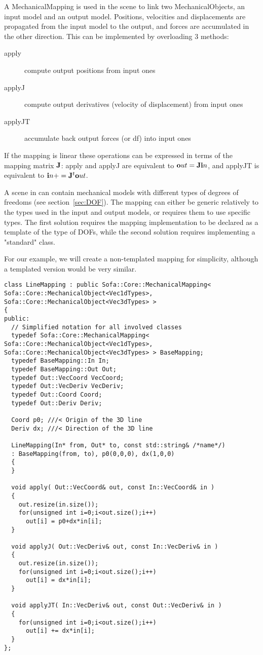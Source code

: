 A MechanicalMapping is used in the scene to link two MechanicalObjects, an input model and an output model. Positions, velocities and displacements are propagated from the input model to the output, and forces are accumulated in the other direction. This can be implemented by overloading 3 methods:

\begin{description}
\item[apply] compute output positions from input ones
\item[applyJ] compute output derivatives (velocity of displacement) from input ones
\item[applyJT] accumulate back output forces (or df) into input ones
\end{description}

If the mapping is linear these operations can be expressed in terms of the mapping matrix $\mathbf J$: apply and applyJ are equivalent to $\mathbf out = \mathbf J \mathbf in$, and applyJT is equivalent to $ \mathbf in += \mathbf J^{t} \mathbf out $.

A scene in \sofa{} can contain mechanical models with different types of degrees of freedoms (see section~\ref{sec:DOF}). The mapping can either be generic relatively to the types used in the input and output models, or requires them to use specific types. The first solution requires the mapping implementation to be declared as a template of the type of DOFs, while the second solution requires implementing a "standard" class.

For our example, we will create a non-templated mapping for simplicity, although a templated version would be very similar.

\begin{verbatim}
class LineMapping : public Sofa::Core::MechanicalMapping< Sofa::Core::MechanicalObject<Vec1dTypes>, Sofa::Core::MechanicalObject<Vec3dTypes> >
{
public:
  // Simplified notation for all involved classes
  typedef Sofa::Core::MechanicalMapping< Sofa::Core::MechanicalObject<Vec1dTypes>, Sofa::Core::MechanicalObject<Vec3dTypes> > BaseMapping;
  typedef BaseMapping::In In;
  typedef BaseMapping::Out Out;
  typedef Out::VecCoord VecCoord;
  typedef Out::VecDeriv VecDeriv;
  typedef Out::Coord Coord;
  typedef Out::Deriv Deriv;

  Coord p0; ///< Origin of the 3D line
  Deriv dx; ///< Direction of the 3D line
  
  LineMapping(In* from, Out* to, const std::string& /*name*/)
  : BaseMapping(from, to), p0(0,0,0), dx(1,0,0)
  {
  }
  
  void apply( Out::VecCoord& out, const In::VecCoord& in )
  {
    out.resize(in.size());
    for(unsigned int i=0;i<out.size();i++)
      out[i] = p0+dx*in[i];
  }
  
  void applyJ( Out::VecDeriv& out, const In::VecDeriv& in )
  {
    out.resize(in.size());
    for(unsigned int i=0;i<out.size();i++)
      out[i] = dx*in[i];
  }
  
  void applyJT( In::VecDeriv& out, const Out::VecDeriv& in )
  {
    for(unsigned int i=0;i<out.size();i++)
      out[i] += dx*in[i];
  }
};
\end{verbatim}

